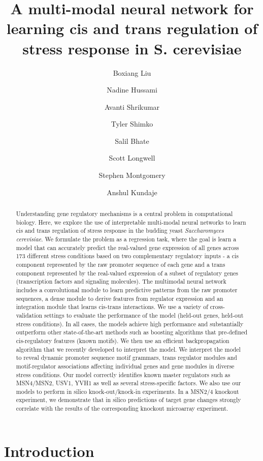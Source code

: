 \documentclass{article}
\title{A multi-modal neural network for learning cis and trans regulation of stress response in S. cerevisiae}
\author[1,2,3]{Boxiang Liu}
\author[4]{Nadine Hussami}
\author[3,5]{Avanti Shrikumar}
\author[3]{Tyler Shimko}
\author[6]{Salil Bhate}
\author[6]{Scott Longwell}
\author[2,3]{Stephen Montgomery}
\author[3,6]{Anshul Kundaje}
\affil[ ]{$^1$Departments of Biology, $^2$Pathology, $^3$Genetics, $^4$Statistics, $^5$Computer Science, and $^6$Bioengineering, Stanford University}
\affil[ ]{\textit{\{bliu2,nadinehu,avanti,tshimko,bhate,longwell,smontgom,akundaje\}@stanford.edu}}
\begin{document}
\maketitle

\begin{abstract}

Understanding gene regulatory mechanisms is a central problem in computational biology. Here, we explore the use of interpretable multi-modal neural networks to learn cis and trans regulation of stress response in the budding yeast \textit{Saccharomyces cerevisiae}. We formulate the problem as a regression task, where the goal is learn a model that can accurately predict the real-valued gene expression of all genes across 173 different stress conditions based on two complementary regulatory inputs - a cis component represented by the raw promoter sequence of each gene and a trans component represented by the real-valued expression of a subset of regulatory genes (transcription factors and signaling molecules). The multimodal neural network includes a convolutional module to learn predictive patterns from the raw promoter sequences, a dense module to derive features from regulator expression and an integration module that learns cis-trans interactions. We use a variety of cross-validation settings to evaluate the performance of the model (held-out genes, held-out stress conditions). In all cases, the models achieve high performance and substantially outperform other state-of-the-art methods such as boosting algorithms that pre-defined cis-regulatory features (known motifs). We then use an efficient backpropagation algorithm that we recently developed to interpret the model. We interpret the model to reveal dynamic promoter sequence motif grammars, trans regulator modules and motif-regulator associations affecting individual genes and gene modules in diverse stress conditions. Our model correctly identifies known master regulators such as MSN4/MSN2, USV1, YVH1 as well as several stress-specific factors. We also use our models to perform in silico knock-out/knock-in experiments. In a MSN2/4 knockout experiment, we demonstrate that in silico predictions of target gene changes strongly correlate with the results of the corresponding knockout microarray experiment.
  
\end{abstract}

\section{Introduction}
\end{document}
